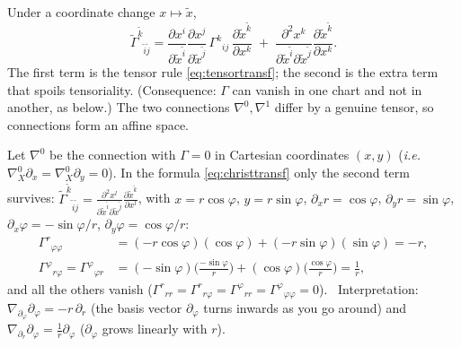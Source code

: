 \documentclass[11pt,a4paper]{article}
\numberwithin{equation}{section}
\theoremstyle{definition}
\theoremstyle{plain}
\newcommand{\ie}{\emph{i.e.}\ }
\begin{document}
\begin{formal}
Under a coordinate change $x\mapsto\tilde x$,
\begin{equation}\label{eq:christtransf}
\tilde\Gamma^{\tilde k}{}_{\tilde i\tilde j}=\frac{\partial x^i}{\partial\tilde x^{\tilde i}}\frac{\partial x^j}{\partial\tilde x^{\tilde j}}\,\Gamma^k{}_{ij}\,\frac{\partial\tilde x^{\tilde k}}{\partial x^k}\;+\;\frac{\partial^2x^k}{\partial\tilde x^{\tilde i}\partial\tilde x^{\tilde j}}\frac{\partial\tilde x^{\tilde k}}{\partial x^k}.
\end{equation}
The first term is the tensor rule \eqref{eq:tensortransf}; the second is the extra term that spoils tensoriality. (Consequence: $\Gamma$ can vanish in one chart and not in another, as below.) The two connections $\nabla^0,\nabla^1$ differ by a genuine tensor, so connections form an affine space.
\end{formal}

\begin{example}
Let $\nabla^0$ be the connection with $\Gamma=0$ in Cartesian coordinates $(x,y)$ (\ie $\nabla^0_X\partial_x=\nabla^0_X\partial_y=0$). In the formula \eqref{eq:christtransf} only the second term survives:
$\tilde\Gamma^{\tilde k}{}_{\tilde i\tilde j}=\frac{\partial^2x^l}{\partial\tilde x^{\tilde i}\partial\tilde x^{\tilde j}}\frac{\partial\tilde x^{\tilde k}}{\partial x^l}$, with $x=r\cos\varphi$, $y=r\sin\varphi$, $\partial_xr=\cos\varphi$, $\partial_yr=\sin\varphi$, $\partial_x\varphi=-\sin\varphi/r$, $\partial_y\varphi=\cos\varphi/r$:
\begin{align*}
\Gamma^r{}_{\varphi\varphi}&=(-r\cos\varphi)(\cos\varphi)+(-r\sin\varphi)(\sin\varphi)=-r,\\
\Gamma^\varphi{}_{r\varphi}=\Gamma^\varphi{}_{\varphi r}&=(-\sin\varphi)\Big(\tfrac{-\sin\varphi}{r}\Big)+(\cos\varphi)\Big(\tfrac{\cos\varphi}{r}\Big)=\tfrac1r,
\end{align*}
and all the others vanish ($\Gamma^r{}_{rr}=\Gamma^r{}_{r\varphi}=\Gamma^\varphi{}_{rr}=\Gamma^\varphi{}_{\varphi\varphi}=0$). \checkmark\ Interpretation: $\nabla_{\partial_\varphi}\partial_\varphi=-r\,\partial_r$ (the basis vector $\partial_\varphi$ turns inwards as you go around) and $\nabla_{\partial_r}\partial_\varphi=\frac1r\partial_\varphi$ ($\partial_\varphi$ grows linearly with $r$).
\end{example}
\end{document}

